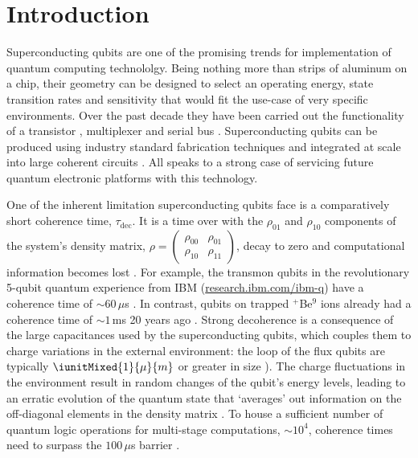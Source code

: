 
\section{Introduction}

\noindent  Superconducting   qubits  are   one  of   the  promising   trends  for
implementation of quantum  computing technololgy. Being nothing  more than strips
of aluminum  on a  chip, their geometry  can be designed  to select  an operating
energy, state  transition rates and  sensitivity that  would fit the  use-case of
very specific environments.  Over the past  decade they have been carried out the
functionality  of  a  transistor  \cite{Astafiev2010}\cite{hoi2011},  multiplexer
\cite{honigl2018} and serial bus  \cite{shen2005}.  Superconducting qubits can be
produced using industry  standard fabrication techniques and  integrated at scale
into large coherent circuits \cite{johnson2010}.  All  speaks to a strong case of
servicing future quantum electronic platforms with this technology.

One of  the inherent  limitation superconducting qubits  face is  a comparatively
short  coherence   time,  $\tau_{\text{dec}}$.    It  is  a   time  over   with  the
$\rho_{01}$   and   $\rho_{10}$   components    of   the   system's   density   matrix,
$\rho  =   \ensuremath{\left(\begin{smallmatrix}  \rho_{00}   &  \rho_{01}  \\   \rho_{10}  &
      \rho_{11}  \end{smallmatrix}\right)}  $,  decay   to  zero  and  computational
information becomes  lost \cite{phaseExp}.  For  example, the transmon  qubits in
the      revolutionary     5-qubit      quantum      experience     from      IBM
(\href{http://www.research.ibm.com/ibm-q}{research.ibm.com/ibm-q})     have     a
coherence time of $ \sim 60\,\mu  $s \cite{linke2017}.  In contrast, qubits on trapped
$ ^{+} $Be$  ^{9} $ ions already had  a coherence time of $\sim1\, $ms  20 years ago
\cite{monroe1995}.  Strong decoherence is a consequence of the large capacitances
used by  the superconducting qubits, which  couples them to charge  variations in
the  external   environment:  the   loop  of  the   flux  qubits   are  typically
$         \iunitMixed{1}{\mu}{m}$         or        greater         in         size
\cite{Astafiev2010}\cite{hoi2011}\cite{johnson2010}).  The charge fluctuations in
the environment result in random changes of the qubit's energy levels, leading to
an erratic evolution of the quantum  state that `averages' out information on the
off-diagonal  elements in  the  density matrix  \cite{devoret2008}.   To house  a
sufficient  number  of quantum  logic  operations  for multi-stage  computations,
$  \sim   10^4  $,  coherence  times   need  to  surpass  the   $  100\,\mu$s  barrier
\cite{orlando1999}.
 
